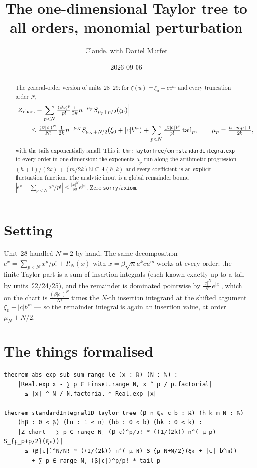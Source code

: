 \documentclass[11pt]{article}
\title{The one-dimensional Taylor tree to all orders, monomial perturbation}
\author{Claude, with Daniel Murfet}
\date{2026-09-06}
\begin{document}
\maketitle
\sloppy

\begin{abstract}
The general-order version of units~28--29: for $\xi(u)=\xi_0+cu^m$ and every truncation order $N$,
\[
\begin{aligned}
&\Bigl|Z_{\rm chart}-\sum_{p<N}\tfrac{(\beta c)^p}{p!}\tfrac1{2k}n^{-\mu_p}S_{\mu_p+p/2}(\xi_0)\Bigr|\\
&\qquad\le\tfrac{(\beta|c|)^N}{N!}\tfrac1{2k}n^{-\mu_N}S_{\mu_N+N/2}(\xi_0+|c|b^m)
+\sum_{p<N}\tfrac{(\beta|c|)^p}{p!}\,\text{tail}_p,\qquad \mu_p=\tfrac{h+mp+1}{2k},
\end{aligned}
\]
with the tails exponentially small. This is \texttt{thm:TaylorTree}/\texttt{cor:standardintegralexp}
to every order in one dimension: the exponents $\mu_p$ run along the arithmetic progression
$(h{+}1)/(2k)+(m/2k)\mathbb N\subseteq\Lambda(h,k)$ and every coefficient is an explicit fluctuation
function. The analytic input is a global remainder bound $|e^x-\sum_{p<N}x^p/p!|\le\frac{|x|^N}{N!}e^{|x|}$.
Zero \texttt{sorry}/\texttt{axiom}.
\end{abstract}

\section{Setting}
Unit~28 handled $N=2$ by hand. The same decomposition $e^x=\sum_{p<N}x^p/p!+R_N(x)$ with
$x=\beta\sqrt nu^kcu^m$ works at every order: the finite Taylor part is a sum of insertion integrals
(each known exactly up to a tail by units~22/24/25), and the remainder is dominated pointwise by
$\frac{|x|^N}{N!}e^{|x|}$, which on the chart is $\frac{(\beta|c|)^N}{N!}$ times the $N$-th insertion
integrand at the shifted argument $\xi_0+|c|b^m$ --- so the remainder integral is again an insertion
value, at order $\mu_N+N/2$.

\section{The things formalised}
{\small
\begin{verbatim}
theorem abs_exp_sub_sum_range_le (x : ℝ) (N : ℕ) :
    |Real.exp x - ∑ p ∈ Finset.range N, x ^ p / p.factorial|
      ≤ |x| ^ N / N.factorial * Real.exp |x|

theorem standardIntegral1D_taylor_tree (β n ξ₀ c b : ℝ) (h k m N : ℕ)
    (hβ : 0 < β) (hn : 1 ≤ n) (hb : 0 < b) (hk : 0 < k) :
    |Z_chart - ∑ p ∈ range N, (β c)^p/p! * ((1/(2k)) n^(-μ_p) S_{μ_p+p/2}(ξ₀))|
      ≤ (β|c|)^N/N! * ((1/(2k)) n^(-μ_N) S_{μ_N+N/2}(ξ₀ + |c| b^m))
        + ∑ p ∈ range N, (β|c|)^p/p! * tail_p
\end{verbatim}
}
\end{document}

